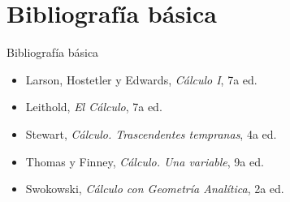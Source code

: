 \documentclass[aspectratio=169,10pt]{beamer}
\begin{document}
\section{Bibliografía básica}
\begin{frame}{Bibliografía básica}
\begin{itemize}
    \item Larson, Hostetler y Edwards, \emph{Cálculo I}, 7a ed.
    \item Leithold, \emph{El Cálculo}, 7a ed.
    \item Stewart, \emph{Cálculo. Trascendentes tempranas}, 4a ed.
    \item Thomas y Finney, \emph{Cálculo. Una variable}, 9a ed.
    \item Swokowski, \emph{Cálculo con Geometría Analítica}, 2a ed.
\end{itemize}
\end{frame}
\end{document}
